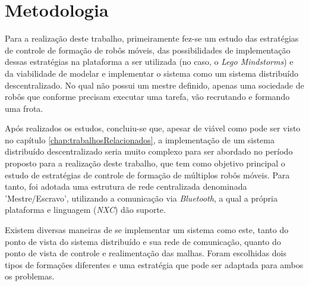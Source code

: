 %
%
\chapter{Metodologia}
\label{chap:Metod}
Para a realização deste trabalho, primeiramente fez-se um estudo das estratégias de controle de formação de robôs móveis, das possibilidades de implementação dessas estratégias na plataforma a ser utilizada (no caso, o \emph{Lego Mindstorms\textregistered}) e da viabilidade de modelar e implementar o sistema como um sistema distribuído descentralizado. No qual não possui um mestre definido, apenas uma sociedade de robôs que conforme precisam executar uma tarefa, vão recrutando e formando uma frota. 

Após realizados os estudos, concluiu-se que, apesar de viável como pode ser visto no capítulo \ref{chap:trabalhosRelacionados}, a implementação de um sistema distribuído descentralizado seria muito complexo para ser abordado no período proposto para a realização deste trabalho, que tem como objetivo principal o estudo de estratégias de controle de formação de múltiplos robôs móveis. Para tanto, foi adotada uma estrutura de rede centralizada denominada 'Mestre/Escravo', utilizando a comunicação via \emph{Bluetooth}, a qual a própria plataforma e linguagem (\emph{NXC}) dão suporte. 


Existem diversas maneiras de se implementar um sistema como este, tanto do ponto de vista do sistema distribuído e sua rede de comunicação, quanto do ponto de vista de controle e realimentação das malhas. Foram escolhidas dois tipos de formações diferentes e uma estratégia que pode ser adaptada para ambos os problemas. %

